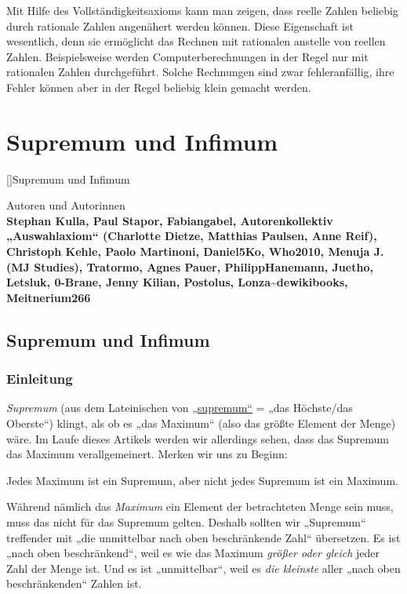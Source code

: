 \documentclass[fontsize=9pt,
               parskip=half-,
               DIV=14,
               listof=chapterentry,
               tocflat]{scrbook}
\newenvironment{authors}{\par\vspace*{\fill}\color{white}Autoren und
Autorinnen\\\bfseries}{\clearpage}
\begin{document}
Mit Hilfe des Vollständigkeitsaxioms kann man zeigen, dass reelle Zahlen beliebig durch rationale Zahlen angenähert werden können. Diese Eigenschaft ist wesentlich, denn sie ermöglicht das Rechnen mit rationalen anstelle von reellen Zahlen. Beispielsweise werden Computerberechnungen in der Regel nur mit rationalen Zahlen durchgeführt. Solche Rechnungen sind zwar fehleranfällig, ihre Fehler können aber in der Regel beliebig klein gemacht werden.

\part{Supremum und Infimum}

[]{Supremum und Infimum}\begin{authors}
Stephan Kulla, Paul Stapor, Fabiangabel, Autorenkollektiv „Auswahlaxiom“ (Charlotte Dietze, Matthias Paulsen, Anne Reif), Christoph Kehle, Paolo Martinoni, Daniel5Ko, Who2010, Menuja J. (MJ Studies), Tratormo, Agnes Pauer, PhilippHanemann, Juetho, Letsluk, 0-Brane, Jenny Kilian, Postolus, Lonza\textasciitilde{}dewikibooks, Meitnerium266\end{authors}

\chapter{Supremum und Infimum}

\section{Einleitung}

\emph{Supremum} (aus dem Lateinischen von \href{https://de.wiktionary.org/wiki/supremum}
{„supremum“} = „das Höchste/das Oberste“) klingt, als ob es „das Maximum“ (also das größte Element der Menge) wäre. Im Laufe dieses Artikels werden wir allerdings sehen, dass das Supremum das Maximum verallgemeinert. Merken wir uns zu Beginn:

\begin{importantparagraph*}
Jedes Maximum ist ein Supremum, aber nicht jedes Supremum ist ein Maximum.

\end{importantparagraph*}

Während nämlich das \emph{Maximum} ein Element der betrachteten Menge sein muss, muss das nicht für das Supremum gelten. Deshalb sollten wir „Supremum“ treffender mit „die unmittelbar nach oben beschränkende Zahl“ übersetzen. Es ist „nach oben beschränkend“, weil es wie das Maximum \emph{größer oder gleich} jeder Zahl der Menge ist. Und es ist „unmittelbar“, weil es \emph{die kleinste} aller „nach oben beschränkenden“ Zahlen ist.
\end{document}
